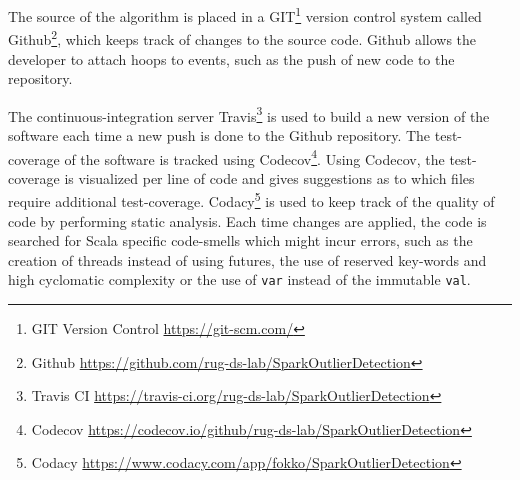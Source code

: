 The source of the algorithm is placed in a GIT\footnote{GIT Version Control \url{https://git-scm.com/}} version control system called Github\footnote{Github \url{https://github.com/rug-ds-lab/SparkOutlierDetection}}, which keeps track of changes to the source code. Github allows the developer to attach hoops to events, such as the push of new code to the repository.

The continuous-integration server Travis\footnote{Travis CI \url{https://travis-ci.org/rug-ds-lab/SparkOutlierDetection}} is used to build a new version of the software each time a new push is done to the Github repository. The test-coverage of the software is tracked using Codecov\footnote{Codecov \url{https://codecov.io/github/rug-ds-lab/SparkOutlierDetection}}. Using Codecov, the test-coverage is visualized per line of code and gives suggestions as to which files require additional test-coverage.
Codacy\footnote{Codacy \url{https://www.codacy.com/app/fokko/SparkOutlierDetection}} is used to keep track of the quality of code by performing static analysis. Each time changes are applied, the code is searched for Scala specific code-smells which might incur errors, such as the creation of threads instead of using futures, the use of reserved key-words and high cyclomatic complexity or the use of \texttt{var} instead of the immutable \texttt{val}. 
